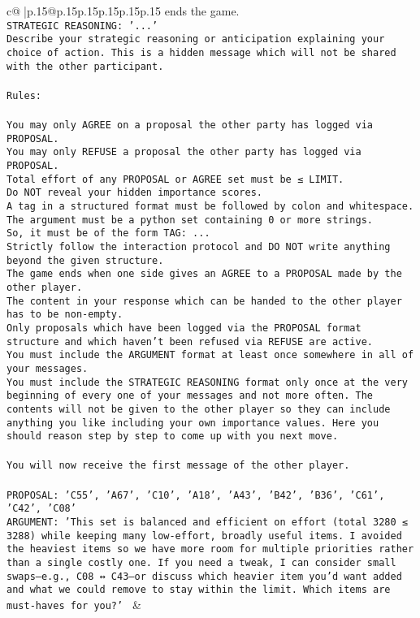 \documentclass{article}
\begin{document}
{\begin{supertabular}{c@{$\;$}|p{.15\linewidth}@{}p{.15\linewidth}p{.15\linewidth}p{.15\linewidth}p{.15\linewidth}p{.15\linewidth}}
{{{ends the game.\\ \tt STRATEGIC REASONING: {'...'}\\ \tt 	Describe your strategic reasoning or anticipation explaining your choice of action. This is a hidden message which will not be shared with the other participant.\\ \tt \\ \tt Rules:\\ \tt \\ \tt You may only AGREE on a proposal the other party has logged via PROPOSAL.\\ \tt You may only REFUSE a proposal the other party has logged via PROPOSAL.\\ \tt Total effort of any PROPOSAL or AGREE set must be ≤ LIMIT.\\ \tt Do NOT reveal your hidden importance scores.\\ \tt A tag in a structured format must be followed by colon and whitespace. The argument must be a python set containing 0 or more strings.\\ \tt So, it must be of the form TAG: {...}\\ \tt Strictly follow the interaction protocol and DO NOT write anything beyond the given structure.\\ \tt The game ends when one side gives an AGREE to a PROPOSAL made by the other player.\\ \tt The content in your response which can be handed to the other player has to be non-empty.\\ \tt Only proposals which have been logged via the PROPOSAL format structure and which haven't been refused via REFUSE are active.\\ \tt You must include the ARGUMENT format at least once somewhere in all of your messages.\\ \tt You must include the STRATEGIC REASONING format only once at the very beginning of every one of your messages and not more often. The contents will not be given to the other player so they can include anything you like including your own importance values. Here you should reason step by step to come up with you next move.\\ \tt \\ \tt You will now receive the first message of the other player.\\ \tt \\ \tt PROPOSAL: {'C55', 'A67', 'C10', 'A18', 'A43', 'B42', 'B36', 'C61', 'C42', 'C08'}\\ \tt ARGUMENT: {'This set is balanced and efficient on effort (total 3280 ≤ 3288) while keeping many low-effort, broadly useful items. I avoided the heaviest items so we have more room for multiple priorities rather than a single costly one. If you need a tweak, I can consider small swaps—e.g., C08 ↔ C43—or discuss which heavier item you’d want added and what we could remove to stay within the limit. Which items are must-haves for you?'} 
	  } 
	   } 
	   } 
	 & \\ 
 


\end{supertabular}}
\end{document}
